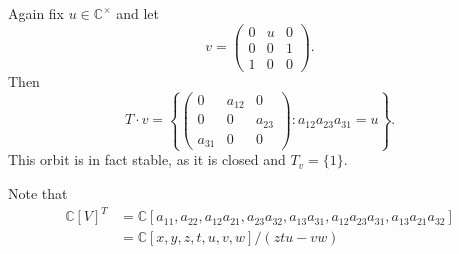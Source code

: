 \documentclass[12pt]{amsart}
\newcommand{\C}{\mathbb{C}}
\theoremstyle{remark}
\theoremstyle{remark}
\begin{document}
Again fix $u \in \C^\times$ and let 
$$v = \begin{pmatrix} 0 & u & 0 \\ 0 & 0 & 1 \\ 1 & 0 & 0 \end{pmatrix}.$$
Then
$$T \cdot v = \left\{
\begin{pmatrix} 0 & a_{12} & 0 \\ 0 & 0 & a_{23} \\ a_{31} & 0 & 0 \end{pmatrix} : a_{12} a_{23} a_{31} = u
\right\}.$$
This orbit is in fact stable, as it is closed and $T_v = \{1\}$.

Note that
\begin{align*}
	\C[V]^T &= \C[a_{11}, a_{22}, a_{12} a_{21}, a_{23} a_{32}, a_{13} a_{31}, a_{12} a_{23} a_{31}, a_{13} a_{21} a_{32}] \\
	&= \C[x, y, z, t, u, v, w] / (z t u - v w)
\end{align*}
\end{document}
